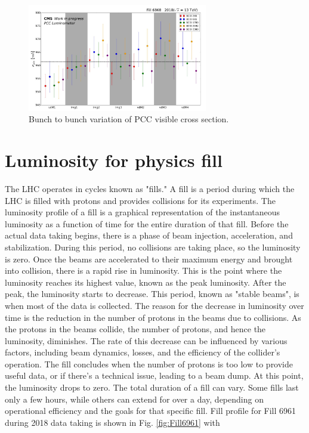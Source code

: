 \begin{figure}[!htp]
\centering
\includegraphics[width=0.7\textwidth]{ashish_thesis/sigma_vis_btob_var_1.png}
\caption[$\sigma_{vis}$ Bunch Variation]{%
 Bunch to bunch variation of PCC visible cross section.
}
\label{fig:sigmavis_btob_variation}
\end{figure}

\newpage
\section{Luminosity for physics fill}

The LHC operates in cycles known as "fills." A fill is a period during which the LHC is filled with protons and provides collisions for its experiments. The luminosity profile of a fill is a graphical representation of the instantaneous luminosity as a function of time for the entire duration of that fill. Before the actual data taking begins, there is a phase of beam injection, acceleration, and stabilization. During this period, no collisions are taking place, so the luminosity is zero. Once the beams are accelerated to their maximum energy and brought into collision, there is a rapid rise in luminosity. This is the point where the luminosity reaches its highest value, known as the peak luminosity. After the peak, the luminosity starts to decrease. This period, known as "stable beams", is when most of the data is collected. The reason for the decrease in luminosity over time is the reduction in the number of protons in the beams due to collisions. As the protons in the beams collide, the number of protons, and hence the luminosity, diminishes. The rate of this decrease can be influenced by various factors, including beam dynamics, losses, and the efficiency of the collider's operation. The fill concludes when the number of protons is too low to provide useful data, or if there's a technical issue, leading to a beam dump. At this point, the luminosity drops to zero. The total duration of a fill can vary. Some fills last only a few hours, while others can extend for over a day, depending on operational efficiency and the goals for that specific fill. Fill profile for Fill 6961 during 2018 data taking is shown in Fig. \ref{fig:Fill6961} with

